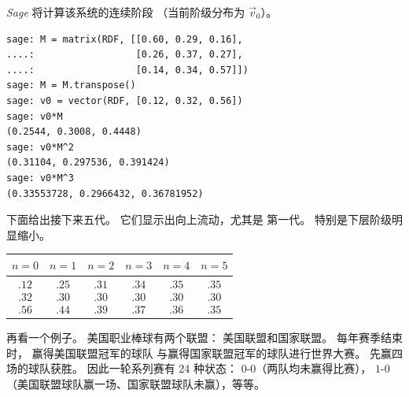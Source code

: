 \textit{Sage} 将计算该系统的连续阶段
（当前阶级分布为 $\vec{v}_0$）。
\begin{lstlisting}
sage: M = matrix(RDF, [[0.60, 0.29, 0.16],
....:                  [0.26, 0.37, 0.27],
....:                  [0.14, 0.34, 0.57]])
sage: M = M.transpose()
sage: v0 = vector(RDF, [0.12, 0.32, 0.56])
sage: v0*M
(0.2544, 0.3008, 0.4448)
sage: v0*M^2
(0.31104, 0.297536, 0.391424)
sage: v0*M^3
(0.33553728, 0.2966432, 0.36781952)  
\end{lstlisting}
下面给出接下来五代。
它们显示出向上流动，尤其是
第一代。
特别是下层阶级明显缩小。
\begin{center}
  \begin{tabular}{c|ccccc}
    $n=0$  &$n=1$  &$n=2$  &$n=3$  &$n=4$  &$n=5$  \\ \hline
    $\begin{array}{l}
               .12 \\ .32  \\ .56
      \end{array}$
    &$\begin{array}{l}
               .25 \\ .30  \\ .44
       \end{array}$
    &$\begin{array}{l}
               .31 \\ .30  \\ .39  
       \end{array}$
    &$\begin{array}{l}
               .34 \\ .30  \\ .37  
       \end{array}$
    &$\begin{array}{l}
               .35 \\ .30 \\ .36  
       \end{array}$
    &$\begin{array}{l}
               .35 \\ .30  \\ .35  
       \end{array}$
  \end{tabular}
\end{center}

再看一个例子。
美国职业棒球有两个联盟：
美国联盟和国家联盟。
每年赛季结束时，
赢得美国联盟冠军的球队
与赢得国家联盟冠军的球队进行世界大赛。
先赢四场的球队获胜。
因此一轮系列赛有 24 种状态：
$0$-$0$（两队均未赢得比赛），
$1$-$0$（美国联盟球队赢一场、国家联盟球队未赢），等等。

